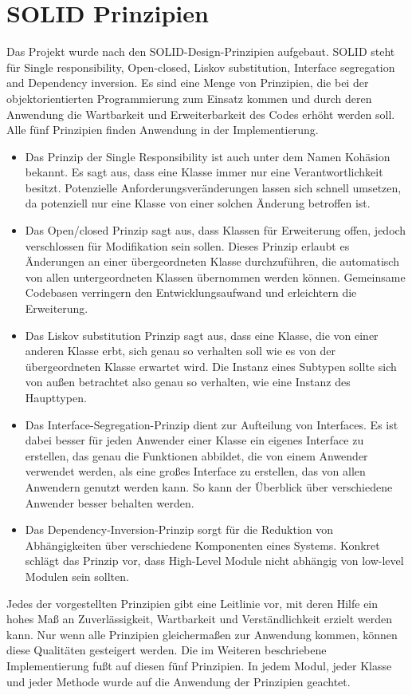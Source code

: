\section{SOLID Prinzipien}

Das Projekt wurde nach den SOLID-Design-Prinzipien \cite{unclebob1995} aufgebaut. SOLID steht für Single responsibility, Open-closed, Liskov substitution, Interface segregation and Dependency inversion. Es sind  eine Menge von Prinzipien, die bei der objektorientierten Programmierung zum Einsatz kommen und durch deren Anwendung die Wartbarkeit und Erweiterbarkeit des Codes erhöht werden soll. Alle fünf Prinzipien finden Anwendung in der Implementierung.

\begin{itemize}
\item Das Prinzip der Single Responsibility  ist auch unter dem Namen Kohäsion bekannt. Es sagt aus, dass eine Klasse immer nur eine Verantwortlichkeit besitzt.  Potenzielle Anforderungsveränderungen lassen sich schnell umsetzen, da potenziell nur eine Klasse von einer solchen Änderung betroffen ist.

\item Das Open/closed Prinzip sagt aus, dass Klassen für Erweiterung offen, jedoch verschlossen für Modifikation sein sollen. Dieses Prinzip erlaubt es Änderungen an einer übergeordneten Klasse durchzuführen, die automatisch von allen untergeordneten Klassen übernommen werden können. Gemeinsame Codebasen verringern den Entwicklungsaufwand und erleichtern die Erweiterung.

\item Das Liskov substitution Prinzip sagt aus, dass eine Klasse, die von einer anderen Klasse erbt, sich genau so verhalten soll wie es von der übergeordneten Klasse erwartet wird. Die Instanz eines Subtypen sollte sich von außen betrachtet also genau so verhalten, wie eine Instanz des Haupttypen.

\item Das Interface-Segregation-Prinzip dient zur Aufteilung von Interfaces. Es ist dabei besser für jeden Anwender einer Klasse ein eigenes Interface zu erstellen, das genau die Funktionen abbildet, die von einem Anwender verwendet werden, als eine großes Interface zu erstellen, das von allen Anwendern genutzt werden kann. So kann der Überblick über verschiedene Anwender besser behalten werden.

\item Das Dependency-Inversion-Prinzip sorgt für die Reduktion von Abhängigkeiten über verschiedene Komponenten eines Systems. Konkret schlägt das Prinzip vor, dass High-Level Module nicht abhängig von low-level Modulen sein sollten.

\end{itemize}

Jedes der vorgestellten Prinzipien gibt eine Leitlinie vor, mit deren Hilfe ein hohes Maß an Zuverlässigkeit, Wartbarkeit und Verständlichkeit erzielt werden kann. Nur wenn alle Prinzipien gleichermaßen zur Anwendung kommen, können diese Qualitäten gesteigert werden. Die im Weiteren beschriebene Implementierung fußt auf diesen fünf Prinzipien. In jedem Modul, jeder Klasse und jeder Methode wurde auf die Anwendung der Prinzipien geachtet.